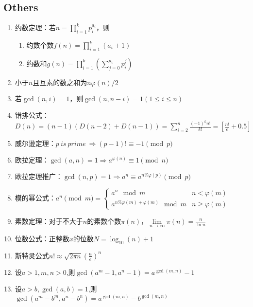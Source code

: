 \documentclass[twoside]{article}
\begin{document}
\subsection{Others}
\begin{enumerate}
\item 约数定理：若$n=\prod_{i=1}^kp_i^{a_i}$，则

\begin{enumerate}
\item 约数个数$f(n)=\prod_{i=1}^k(a_i+1)$
\item 约数和$g(n)=\prod_{i=1}^k(\sum_{j=0}^{a_i}p_i^j)$
\end{enumerate}

\item 小于$n$且互素的数之和为$n\varphi(n)/2$

\item 若$\gcd(n,i)=1$，则$\gcd(n,n-i)=1(1\leq i\leq n)$

\item 错排公式：$D(n)=(n-1)(D(n-2)+D(n-1))=\sum_{i=2}^n\frac{(-1)^kn!}{k!}=[\frac{n!}{e}+0.5]$

\item 威尔逊定理：$p\ is\ prime\ \Rightarrow (p-1)!\equiv-1\pmod p$

\item 欧拉定理：$\gcd(a,n)=1\Rightarrow a^{\varphi(n)}\equiv1\pmod n$

\item 欧拉定理推广：$\gcd(n,p)=1\Rightarrow a^n\equiv a^{n\%\varphi(p)}\pmod p$

\item 模的幂公式：$a ^ n \pmod {m} = 
\begin{cases}
a ^ n \mod m & n < \varphi(m)\\
a ^ {n \% \varphi(m) + \varphi(m)} \mod m & n \ge \varphi(m)
\end{cases}
$

\item 素数定理：对于不大于$n$的素数个数$\pi(n)$，$\lim\limits_{n\to\infty}\pi(n)=\frac{n}{\ln n}$

\item 位数公式：正整数$x$的位数$N=\log_{10}(n)+1$

\item 斯特灵公式$n!\approx\sqrt{2\pi n}(\frac{n}{e})^n$

\item 设$a>1,m,n>0$,则$\gcd(a^m-1,a^n-1)=a^{\gcd(m,n)}-1$

\item 设$a>b,\gcd(a,b)=1$,则$\gcd(a^m-b^m,a^n-b^n)=a^{\gcd(m,n)}-b^{\gcd(m,n)}$


\end{enumerate}
\end{document}
